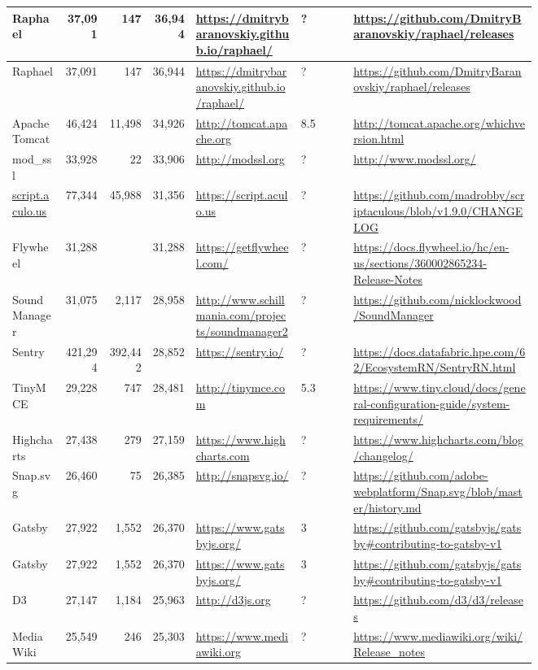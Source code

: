 \begin{landscape}
\begin{longtable}{|p{0.1\linewidth}|r|r|r|p{0.2\linewidth}|p{0.1\linewidth}|p{0.35\linewidth}|}
		Raphael &37,091 &147 &36,944 &\url{https://dmitrybaranovskiy.github.io/raphael/} &? &\url{https://github.com/DmitryBaranovskiy/raphael/releases} \\\hline
		Raphael &37,091 &147 &36,944 &\url{https://dmitrybaranovskiy.github.io/raphael/} &? &\url{https://github.com/DmitryBaranovskiy/raphael/releases} \\\hline
		Apache Tomcat &46,424 &11,498 &34,926 &\url{http://tomcat.apache.org} &8.5 &\url{http://tomcat.apache.org/whichversion.html} \\\hline
		mod\_ssl &33,928 &22 &33,906 &\url{http://modssl.org} &? &\url{http://www.modssl.org/} \\\hline
		\url{script.aculo.us} &77,344 &45,988 &31,356 &\url{https://script.aculo.us} &? &\url{https://github.com/madrobby/scriptaculous/blob/v1.9.0/CHANGELOG} \\\hline
		Flywheel &31,288 & &31,288 &\url{https://getflywheel.com/} &? &\url{https://docs.flywheel.io/hc/en-us/sections/360002865234-Release-Notes} \\\hline
		SoundManager &31,075 &2,117 &28,958 &\url{http://www.schillmania.com/projects/soundmanager2} &? &\url{https://github.com/nicklockwood/SoundManager} \\\hline
		Sentry &421,294 &392,442 &28,852 &\url{https://sentry.io/} &? &\url{https://docs.datafabric.hpe.com/62/EcosystemRN/SentryRN.html} \\\hline
		TinyMCE &29,228 &747 &28,481 &\url{http://tinymce.com} &5.3 &\url{https://www.tiny.cloud/docs/general-configuration-guide/system-requirements/} \\\hline
		Highcharts &27,438 &279 &27,159 &\url{https://www.highcharts.com} &? &\url{https://www.highcharts.com/blog/changelog/} \\\hline
		Snap.svg &26,460 &75 &26,385 &\url{http://snapsvg.io/} &? &\url{https://github.com/adobe-webplatform/Snap.svg/blob/master/history.md} \\\hline
		Gatsby &27,922 &1,552 &26,370 &\url{https://www.gatsbyjs.org/} &3 &\url{https://github.com/gatsbyjs/gatsby\#contributing-to-gatsby-v1} \\\hline
		Gatsby &27,922 &1,552 &26,370 &\url{https://www.gatsbyjs.org/} &3 &\url{https://github.com/gatsbyjs/gatsby\#contributing-to-gatsby-v1} \\\hline
		D3 &27,147 &1,184 &25,963 &\url{http://d3js.org} &? &\url{https://github.com/d3/d3/releases} \\\hline
		MediaWiki &25,549 &246 &25,303 &\url{https://www.mediawiki.org} &? &\url{https://www.mediawiki.org/wiki/Release\_notes} \\\hline

\end{longtable}
\end{landscape}
